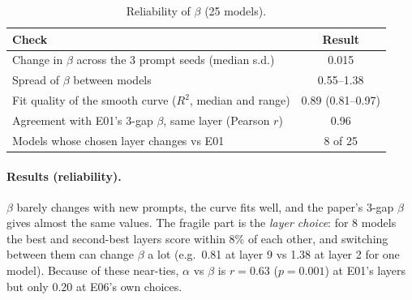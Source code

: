 \documentclass[11pt]{article}
\begin{document}
\begin{table}[h]
\centering\small
\caption{Reliability of $\beta$ (25 models).}
\label{tab:e06rel}
\begin{tabular}{@{}lc@{}}
\toprule
Check & Result \\
\midrule
Change in $\beta$ across the 3 prompt seeds (median s.d.) & 0.015 \\
Spread of $\beta$ between models & 0.55--1.38 \\
Fit quality of the smooth curve ($R^2$, median and range) & 0.89 (0.81--0.97) \\
Agreement with E01's 3-gap $\beta$, same layer (Pearson $r$) & 0.96 \\
Models whose chosen layer changes vs E01 & 8 of 25 \\
\bottomrule
\end{tabular}
\end{table}

\paragraph{Results (reliability).} $\beta$ barely changes with new prompts, the curve fits well, and
the paper's 3-gap $\beta$ gives almost the same values. The fragile part is the \emph{layer choice}:
for 8 models the best and second-best layers score within 8\% of each other, and switching
between them can change $\beta$ a lot (e.g.\ 0.81 at layer 9 vs 1.38 at layer 2 for one model).
Because of these near-ties, $\alpha$ vs $\beta$ is $r=0.63$ ($p=0.001$) at E01's layers but only 0.20
at E06's own choices.
\end{document}
